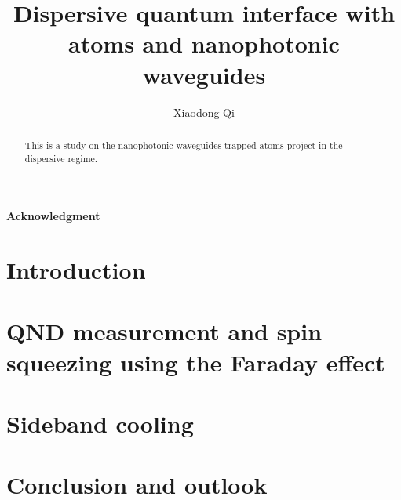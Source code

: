 \documentclass[]{report}
\title{Dispersive quantum interface with atoms and nanophotonic waveguides}
\author{Xiaodong Qi}
\begin{document}
\maketitle

\begin{abstract}
This is a study on the nanophotonic waveguides trapped atoms project in the dispersive regime. 
\end{abstract}

\tableofcontents

\newpage
\textbf{Acknowledgment}


\chapter{Introduction}










\chapter{QND measurement and spin squeezing using the Faraday effect}

\chapter{Sideband cooling}

\chapter{Conclusion and outlook}

\appendix






%








%

\ifwindows
	
\else
	
\fi

\printindex
\end{document}
